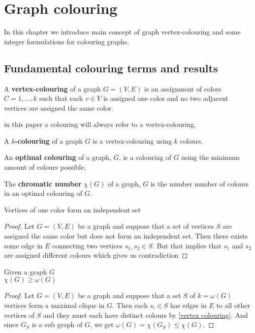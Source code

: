 \chapter{Graph colouring}\label{chap:GC}
In this chapter we introduce main concept of graph vertex-colouring and some integer formulations for colouring graphs.
\section{Fundamental colouring terms and results}
\begin{definition}\label{vertex colouring}
A \textbf{vertex-colouring} of a graph $G=(V,E)$ is an assignment of colors $C = {1,...,k}$ such that each $v\in V$ is assigned one color and no two adjacent vertices are assigned the same color.
\end{definition}
in this paper a colouring will always refer to a vertex-colouring.
\begin{definition}
A \textbf{$k$-colouring} of a graph $G$ is a vertex-colouring using $k$ colours.
\end{definition}
\begin{definition}\label{cromatic number}
An \textbf{optimal colouring} of a graph, $G$, is a colouring of $G$ using the minimum amount of colours possible.
\end{definition}
\begin{definition}\label{cromatic number}
The \textbf{chromatic number} $\chi (G)$ of a graph, $G$ is the number number of colours in an optimal colouring of $G$.
\end{definition}
\begin{theorem}
Vertices of one color form an independent set
\begin{proof}
Let $G=(V,E)$ be a graph and suppose that a set of vertices $S$ are assigned the same color but does not form an independent set. Then there exists some edge in $E$ connecting two vertices $s_1,s_2 \in S$. But that implies that $s_1$ and $s_2$ are assigned different colours which gives us contradiction
\end{proof}
\end{theorem}
\begin{theorem}
Given a graph $G$\\
$\chi (G) \geq \omega(G)$
\begin{proof}
Let $G=(V,E)$ be a graph and suppose that a set $S$ of $k = \omega(G)$ vertices form a maximal clique in $G$. Then each $s_i \in S$ has edges in $E$ to all other vertices of $S$ and they must each have distinct colours by \ref{vertex colouring}. And since $G_S$ is a sub graph of $G$, we get $\omega(G)= \chi(G_S) \leq \chi(G)$.
\end{proof}
\end{theorem}
